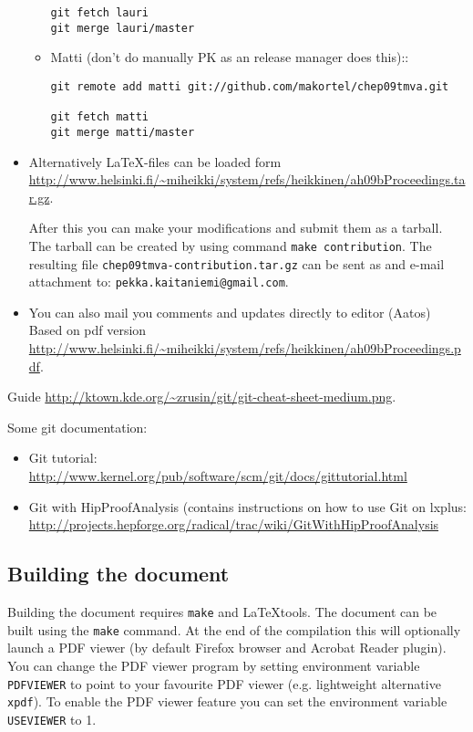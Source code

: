 \begin{appendix}
\begin{itemize}
\begin{itemize}
\begin{verbatim}
git fetch lauri
git merge lauri/master

\end{verbatim}

\item Matti (don't do manually PK as an release manager does this)::
\begin{verbatim}
git remote add matti git://github.com/makortel/chep09tmva.git

git fetch matti
git merge matti/master
\end{verbatim}
\end{itemize}

\item Alternatively LaTeX-files can be loaded form
\url{http://www.helsinki.fi/~miheikki/system/refs/heikkinen/ah09bProceedings.tar.gz}.

After this you can make your modifications and submit them as a
tarball. The tarball can be created by using command {\tt make
contribution}. The resulting file {\tt chep09tmva-contribution.tar.gz}
can be sent as and e-mail attachment to: {\tt pekka.kaitaniemi@gmail.com}.

\item You can also mail you comments and updates directly to editor (Aatos)
Based on pdf version
\url{http://www.helsinki.fi/~miheikki/system/refs/heikkinen/ah09bProceedings.pdf}.
\end{itemize}

Guide \url{http://ktown.kde.org/~zrusin/git/git-cheat-sheet-medium.png}.

Some git documentation:
\begin{itemize}
\item Git tutorial: \url{http://www.kernel.org/pub/software/scm/git/docs/gittutorial.html}
\item Git with HipProofAnalysis (contains instructions on how to use
  Git on lxplus:
  \url{http://projects.hepforge.org/radical/trac/wiki/GitWithHipProofAnalysis}
\end{itemize}

\subsection{Building the document}

Building the document requires {\tt make} and \LaTeX tools. The
document can be built using the {\tt make} command. At the end of the
compilation this will optionally launch a PDF viewer (by default Firefox browser
and Acrobat Reader plugin). You can change the PDF viewer program by
setting environment variable {\tt PDFVIEWER} to point to your
favourite PDF viewer (e.g. lightweight alternative {\tt xpdf}). To
enable the PDF viewer feature you can set the environment
variable {\tt USEVIEWER} to 1.


\end{appendix}
